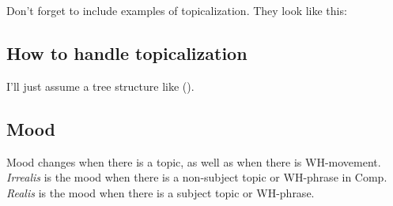 Don't forget to include examples of topicalization.
They look like this:

{\small
{}
}

\subsection*{How to handle topicalization}

I'll just assume a tree structure like ().

{\small
{}
}

\subsection*{Mood}

Mood changes when there is a topic, as well as when
there is WH-movement.  \emph{Irrealis} is the mood when
there is a non-subject topic or WH-phrase in Comp.
\emph{Realis} is the mood when there is a subject topic
or WH-phrase.


